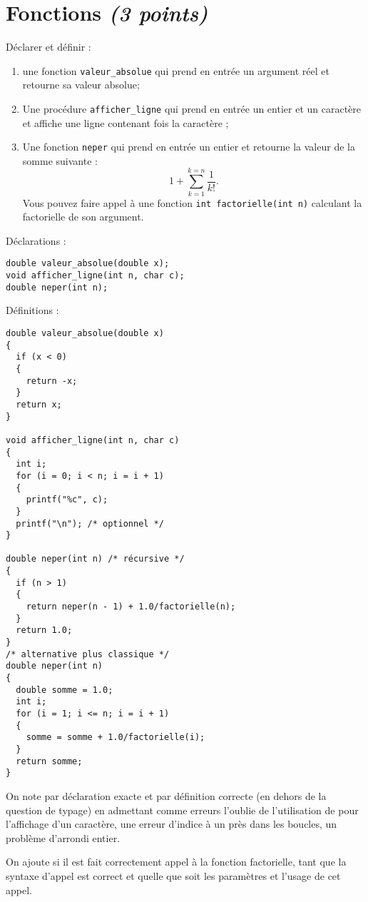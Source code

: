 \section{Fonctions \emph{(3 points)}}
\question Déclarer et définir :
\begin{enumerate}
\item une fonction \verb|valeur_absolue| qui  prend en entrée un argument réel
  et retourne sa valeur absolue;
\item Une procédure \verb|afficher_ligne| qui prend en entrée un
  entier  et un caractère  et affiche une ligne contenant
   fois la caractère ;
\item Une fonction \verb|neper| qui prend en entrée un entier  et
  retourne la valeur de la somme suivante :
\[
1 + \sum^{k = n}_{k = 1} \frac{1}{k!}.
\]
Vous pouvez faire appel à une
  fonction \verb|int factorielle(int n)| calculant la factorielle de
  son argument.
\end{enumerate}


\begin{correction}
Déclarations :
\begin{verbatim}
double valeur_absolue(double x);
void afficher_ligne(int n, char c);
double neper(int n);
\end{verbatim}

Définitions :
\begin{verbatim}
double valeur_absolue(double x)
{
  if (x < 0)
  {
    return -x;
  }
  return x;
}

void afficher_ligne(int n, char c)
{
  int i;
  for (i = 0; i < n; i = i + 1)
  {
    printf("%c", c);
  }
  printf("\n"); /* optionnel */
}

double neper(int n) /* récursive */
{
  if (n > 1)
  {
    return neper(n - 1) + 1.0/factorielle(n);
  }
  return 1.0;
}
/* alternative plus classique */
double neper(int n) 
{
  double somme = 1.0;
  int i;
  for (i = 1; i <= n; i = i + 1)
  {
    somme = somme + 1.0/factorielle(i);
  }
  return somme;
}

\end{verbatim}

  \begin{baremeenv}
    On note  par déclaration exacte et  par définition
    correcte (en dehors de la question de typage) en admettant comme
    erreurs l'oublie de l'utilisation de  pour l'affichage d'un
    caractère, une erreur d'indice à un près dans les boucles, un
    problème d'arrondi entier.

   On ajoute  si il est fait correctement appel à  la fonction factorielle,
   tant que la syntaxe d'appel est correct et quelle que soit les
   paramètres et l'usage de cet appel.
  \end{baremeenv}
\end{correction}

